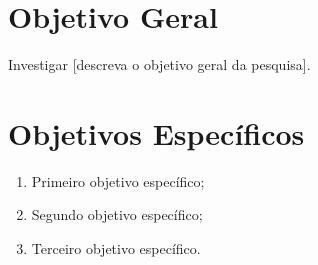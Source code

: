 
\section{Objetivo Geral}

Investigar [descreva o objetivo geral da pesquisa].

\section{Objetivos Específicos}

\begin{enumerate}
  \item Primeiro objetivo específico;
  \item Segundo objetivo específico;
  \item Terceiro objetivo específico.
\end{enumerate}
